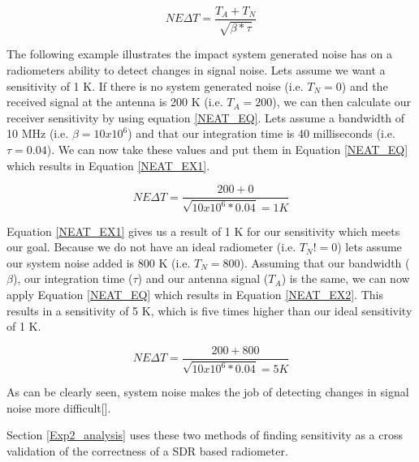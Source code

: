 \begin{equation} \label{NEAT_EQ}
NE\Delta T=\frac{T_{A}+T_{N}}{\sqrt{\beta * \tau}} 
\end{equation}

The following example illustrates the impact system generated noise has on a radiometers ability to detect changes in signal noise.  Lets assume we want a sensitivity of 1 K.  If there is no system generated noise (i.e. $T_N = 0$) and the received signal at the antenna is 200 K (i.e. $T_A = 200$), we can then calculate our receiver sensitivity by using equation \ref{NEAT_EQ}.  Lets assume a bandwidth of 10 MHz (i.e. $\beta = 10 x 10^6$) and that our integration time is 40 milliseconds (i.e. $\tau = 0.04$).  We can now take these values and put them in Equation \ref{NEAT_EQ} which results in Equation \ref{NEAT_EX1}.

\begin{equation} \label{NEAT_EX1}
NE\Delta T=\frac{200 + 0}{\sqrt{10 x 10^6 * 0.04} = 1 K} 
\end{equation}

Equation \ref{NEAT_EX1} gives us a result of 1 K for our sensitivity which meets our goal.  Because we do not have an ideal radiometer (i.e. $T_N != 0$) lets assume our system noise added is 800 K (i.e. $T_N = 800$).  Assuming that our bandwidth ($\beta$), our integration time ($\tau$) and our antenna signal ($T_A$) is the same, we can now apply Equation \ref{NEAT_EQ} which results in Equation \ref{NEAT_EX2}.  This results in a sensitivity of 5 K, which is five times higher than our ideal sensitivity of 1 K. 

\begin{equation} \label{NEAT_EX2}
NE\Delta T=\frac{200 + 800}{\sqrt{10 x 10^6 * 0.04} = 5 K} 
\end{equation}

As can be clearly seen, system noise makes the job of detecting changes in signal noise more difficult[\cite{skou}].

Section \ref{Exp2_analysis} uses these two methods of finding sensitivity as a cross validation of the correctness of a SDR based radiometer.


